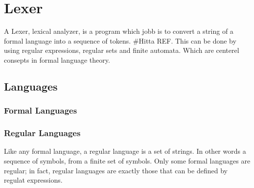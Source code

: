 \chapter{Lexer}
A Lexer, lexical analyzer, is a program which jobb is to convert a string of a
formal language into a sequence of tokens. \#Hitta REF.
This can be done by using regular expressions, regular sets and finite
automata. Which are centerel consepts in formal language theory. \cite{Aho} 
\section{Languages}
\subsection{Formal Languages}
\subsection{Regular Languages}
Like any formal language, a regular language is a set of strings. In other words a sequence of symbols,
from a finite set of symbols. Only some formal languages are regular; in fact, 
regular languages are exactly those that can be defined by regulat expressions.
\cite{Ranta2012}

